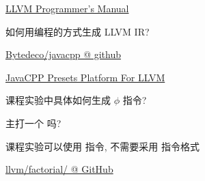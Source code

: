 
\begin{frame}{}
	\begin{center}
		\href{https://llvm.org/docs/ProgrammersManual.html}{LLVM Programmer's Manual}

		\vspace{0.30cm}

		\vspace{0.50cm}
		如何用编程的方式生成 LLVM IR?
	\end{center}
\end{frame}

\begin{frame}{}
	\begin{center}
		\href{https://github.com/bytedeco/javacpp}{Bytedeco/javacpp @ github}

		\vspace{0.30cm}
		\href{https://mvnrepository.com/artifact/org.bytedeco/llvm-platform/15.0.3-1.5.8}{JavaCPP Presets Platform For LLVM}

		\vspace{0.50cm}
	\end{center}
\end{frame}

\begin{frame}{}
	\begin{center}
		课程实验中具体如何生成 $\phi$ 指令?

		\vspace{0.30cm}
		\vspace{0.30cm}

		主打一个 吗?

		\pause
		\vspace{0.60cm}
		课程实验可以使用 \texttt{} 指令, 不需要采用 \teal{$\phi$} 指令格式
	\end{center}
\end{frame}

\begin{frame}{}
	\begin{center}
		\href{https://github.com/courses-at-nju-by-hfwei/2024-compilers-coding/tree/main/src/main/java/llvm/factorial}{llvm/factorial/ @ GitHub}

		\vspace{0.50cm}
	\end{center}
\end{frame}

